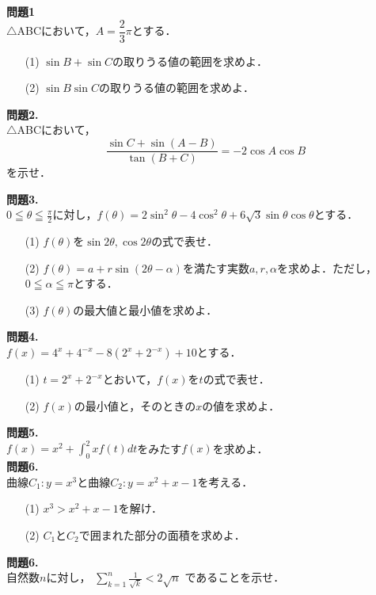 \documentclass[a4paper]{ltjsarticle}
\title{}
\author{}
\date{}
\begin{document}
\pagestyle{empty}
\noindent \textbf{問題1}\\
$\triangle $ABCにおいて，$A=\dfrac23\pi$とする．
\begin{itemize}
    \item [(1)]$\sin B+\sin C$の取りうる値の範囲を求めよ．
    \item [(2)]$\sin B\sin C$の取りうる値の範囲を求めよ．
\end{itemize}

\noindent \textbf{問題2.}\\
$\triangle$ABCにおいて，
\[\frac{\sin C+\sin (A-B)}{\tan(B+C)}=-2\cos A\cos B\]
を示せ．

\noindent \textbf{問題3.}\\
$\displaystyle{0\leqq\theta\leqq\frac\pi2}$に対し，$f(\theta)=2\sin^2\theta -4\cos^2\theta +6\sqrt3\sin\theta\cos\theta$とする．
\begin{itemize}
    \item [(1)]$f(\theta)$を$\sin2\theta,\cos2\theta$の式で表せ．
    \item [(2)]$f(\theta)=a+r\sin(2\theta-\alpha)$を満たす実数$a,r,\alpha$を求めよ．ただし，$0\leqq \alpha\leqq\pi$とする．
    \item [(3)]$f(\theta)$の最大値と最小値を求めよ．
\end{itemize}

\noindent \textbf{問題4.}\\
$f(x)=4^x+4^{-x}-8(2^x+2^{-x})+10$とする．
\begin{itemize}
    \item [(1)]$t=2^x+2^{-x}$とおいて，$f(x)$を$t$の式で表せ．
    \item [(2)]$f(x)$の最小値と，そのときの$x$の値を求めよ．
\end{itemize}

\noindent \textbf{問題5.}\\
$f(x)=x^2+\displaystyle{\int_0^2xf(t)dt}$をみたす$f(x)$を求めよ．\\

\noindent \textbf{問題6.}\\
曲線$C_1:y=x^3$と曲線$C_2:y=x^2+x-1$を考える．
\begin{itemize}
    \item[(1)]$x^3>x^2+x-1$を解け．
    \item[(2)]$C_1$と$C_2$で囲まれた部分の面積を求めよ． 
\end{itemize}


\noindent \textbf{問題6.}\\
自然数$n$に対し，
$\displaystyle{\sum_{k=1}^n\frac{1}{\sqrt{k}}<2\sqrt n}$
であることを示せ．
\end{document}
